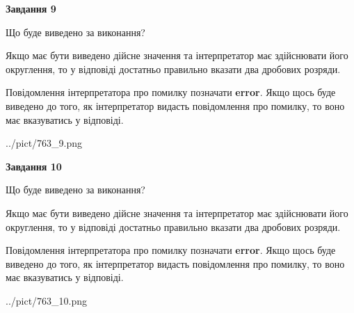 \documentclass[12pt, ukrainian]{article}
\begin{document}
{\begin {Large}
{\begin {center}\textbf{Завдання 9}\end {center}}\par
Що буде виведено за виконання? \par

Якщо має бути виведено дійсне значення та інтерпретатор має здійснювати його округлення, 
то у відповіді достатньо правильно вказати два дробових розряди.

Повідомлення інтерпретатора про помилку позначати \textbf{error}.
Якщо щось буде виведено до того, як інтерпретатор видасть повідомлення про помилку, 
то воно має вказуватись у відповіді. \par

\begin{center}
	{../pict/763_9.png}
\end{center}
\newpage

{\begin {center}\textbf{Завдання 10}\end {center}}\par
Що буде виведено за виконання? \par

Якщо має бути виведено дійсне значення та інтерпретатор має здійснювати його округлення, 
то у відповіді достатньо правильно вказати два дробових розряди.

Повідомлення інтерпретатора про помилку позначати \textbf{error}.
Якщо щось буде виведено до того, як інтерпретатор видасть повідомлення про помилку, 
то воно має вказуватись у відповіді. \par

\begin{center}
	{../pict/763_10.png}
\end{center}
\newpage

\end {Large}}
\end{document}
